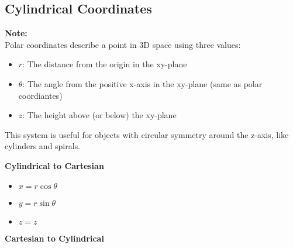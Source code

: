 \documentclass[10pt]{article}                               %
\begin{document}
\begin{defaultbox}
\begin{adjustwidth}{2em}{0pt}
\begin{adjustwidth}{2em}{0pt}
\begin{examplebox}
            \end{examplebox}


        \end{adjustwidth}


        \subsection*{Cylindrical Coordinates}

        \begin{adjustwidth}{2em}{0pt}

            \begin{notebox}

                \textbf{Note:} \\
                Polar coordinates describe a point in 3D space using three values:

                \begin{itemize}
                    \item \( r \): The distance from the origin in the xy-plane
                    \item \( \theta \): The angle from the positive x-axis in the xy-plane (same as polar coordiantes)
                    \item \( z \): The height above (or below) the xy-plane
                \end{itemize}

                This system is useful for objects with circular symmetry around the z-axis, like cylinders and spirals.

            \end{notebox}

            \vspace{0.5em}

            \textbf{Cylindrical to Cartesian}

            \begin{itemize}
                \item \( x = r\cos\theta \)
                \item \( y = r\sin\theta \)
                \item \( z = z \)
            \end{itemize}

            \vspace{0.5em}

            \textbf{Cartesian to Cylindrical}


\end{adjustwidth}
\end{adjustwidth}
\end{defaultbox}
\end{document}
